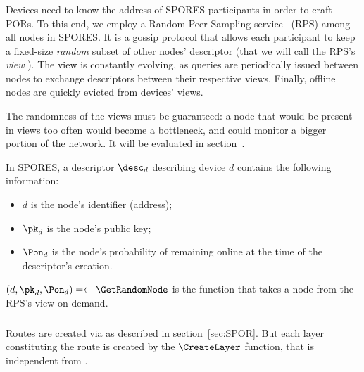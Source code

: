 \subsubsection{\GetRandomNode}
\label{sssec:global_overlay}

Devices need to know the address of SPORES participants in order to craft PORs.
To this end, we employ a Random Peer Sampling service~\cite{Jelasity_Voulgaris_Guerraoui_Kermarrec_van_Steen_2007,Jesi_Montresor_van_Steen_2010} (RPS) among all nodes in SPORES.
It is a gossip protocol that allows each participant to keep a fixed-size \emph{random} subset of other nodes' descriptor (that we will call the RPS's \emph{view} \rpsview). 
The view is constantly evolving, as queries are periodically issued between nodes to exchange descriptors between their respective views.
Finally, offline nodes are quickly evicted from devices' views.

The randomness of the views must be guaranteed: 
a node that would be present in views too often would become a bottleneck, and could monitor a bigger portion of the network.
It will be evaluated in section~.

In SPORES, a descriptor $\desc_d$ describing device $d$ contains the following information:
\begin{itemize}
  \item \(d\) is the node's identifier (address);
  \item \(\pk_d\) is the node's public key;
  \item \(\Pon_d\) is the node's probability of remaining online at the time of the descriptor's creation.
\end{itemize}

$(d, \pk_d, \Pon_d)= \leftarrow \GetRandomNode$ is the function that takes a node from the RPS's view \rpsview on demand.

\subsubsection{\CreateLayer}
\label{sssec:routes_creation}


Routes are created via \Sphinxes as described in section~\ref{sec:SPOR}.
But each layer \layer constituting the route is created by the $\CreateLayer$ function, that is independent from \Sphinxes.

